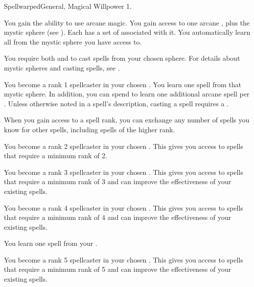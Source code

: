     \begin{feat}{Spellwarped}{General, Magical}
        \featpre Willpower 1.

         You gain the ability to use arcane magic.
        You gain access to one arcane , plus the  mystic sphere (see ).
        Each  has a set of  associated with it.
        You automatically learn all  from the mystic sphere you have access to.

        You require both  and  to cast spells from your chosen sphere.
        For details about mystic spheres and casting spells, see .

         You become a rank 1 spellcaster in your chosen .
        You learn one spell from that mystic sphere.
        In addition, you can spend  to learn one additional arcane spell per .
        Unless otherwise noted in a spell's description, casting a spell requires a .

        When you gain access to a spell rank,
            you can exchange any number of spells you know for other spells,
            including spells of the higher rank.

         You become a rank 2 spellcaster in your chosen .
        This gives you access to spells that require a minimum rank of 2.

         You become a rank 3 spellcaster in your chosen .
        This gives you access to spells that require a minimum rank of 3 and can improve the effectiveness of your existing spells.

         You become a rank 4 spellcaster in your chosen .
        This gives you access to spells that require a minimum rank of 4 and can improve the effectiveness of your existing spells.

         You learn one spell from your .

         You become a rank 5 spellcaster in your chosen .
        This gives you access to spells that require a minimum rank of 5 and can improve the effectiveness of your existing spells.


\end{feat}
